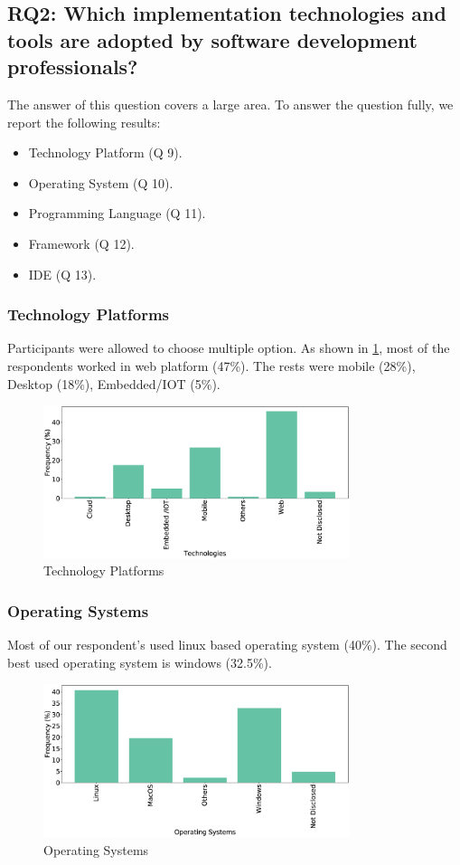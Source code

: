 \subsection{RQ2: Which implementation technologies and tools are adopted by software development professionals?}
\label{RQ2}
The answer of this question covers a large area. To answer the question fully, we report the following results:
\begin{itemize}
\item Technology Platform (Q 9).
\item Operating System (Q 10).
\item Programming Language (Q 11).
\item Framework (Q 12).
\item IDE (Q 13).
\end{itemize}

\subsubsection{Technology Platforms}
Participants were allowed to choose multiple option. As shown in \cref{fig:platforms}, most of the respondents worked in web platform (47\%). The rests were mobile (28\%), Desktop (18\%), Embedded/IOT (5\%).
\begin{figure}[]
\centering
  \includegraphics[width=0.8\textwidth]{Figures/Respondents_Technologies}
  \caption{Technology Platforms}
  \label{fig:platforms}
\end{figure}

\subsubsection{Operating Systems}
Most of our respondent's used linux based operating system (40\%). The second best used operating system is windows (32.5\%).
\begin{figure}[]
\centering
  \includegraphics[width=0.8\textwidth]{Figures/Respondents_os}
  \caption{Operating Systems}
  \label{fig:os}
\end{figure}

